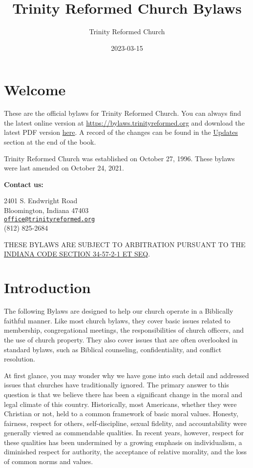 \documentclass[
]{book}
\title{Trinity Reformed Church Bylaws}
\author{Trinity Reformed Church}
\date{2023-03-15}
\begin{document}
\maketitle

{
\hypersetup{linkcolor=}
\setcounter{tocdepth}{1}
\tableofcontents
}
\hypertarget{welcome}{%
\chapter*{Welcome}\label{welcome}}

These are the official bylaws for Trinity Reformed Church. You can always find the latest online version at \url{https://bylaws.trinityreformed.org} and download the latest PDF version \href{https://bylaws.trinityreformed.org/trc-bylaws.pdf}{here}. A record of the changes can be found in the \href{https://bylaws.trinityreformed.org/updates.html}{Updates} section at the end of the book.

Trinity Reformed Church was established on October 27, 1996. These bylaws were last amended on October 24, 2021.

\textbf{Contact us:}

2401 S. Endwright Road\\
Bloomington, Indiana 47403\\
\href{mailto:office@trinityreformed.org}{\nolinkurl{office@trinityreformed.org}}\\
(812) 825-2684

THESE BYLAWS ARE SUBJECT TO ARBITRATION PURSUANT TO THE \href{https://iga.in.gov/legislative/laws/2022/ic/titles/034\#34-57-2-1}{INDIANA CODE SECTION 34-57-2-1 ET SEQ}.

\mainmatter

\hypertarget{introduction}{%
\chapter{Introduction}\label{introduction}}

The following Bylaws are designed to help our church operate in a Biblically faithful manner. Like most church bylaws, they cover basic issues related to membership, congregational meetings, the responsibilities of church officers, and the use of church property. They also cover issues that are often overlooked in standard bylaws, such as Biblical counseling, confidentiality, and conflict resolution.

At first glance, you may wonder why we have gone into such detail and addressed issues that churches have traditionally ignored. The primary answer to this question is that we believe there has been a significant change in the moral and legal climate of this country. Historically, most Americans, whether they were Christian or not, held to a common framework of basic moral values. Honesty, fairness, respect for others, self-discipline, sexual fidelity, and accountability were generally viewed as commendable qualities. In recent years, however, respect for these qualities has been undermined by a growing emphasis on individualism, a diminished respect for authority, the acceptance of relative morality, and the loss of common norms and values.
\end{document}
